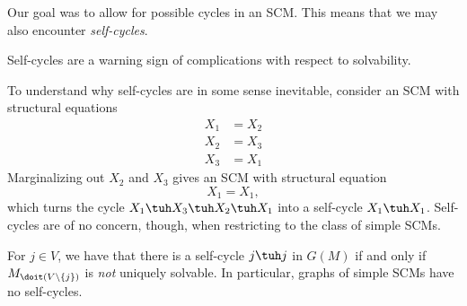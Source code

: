 Our goal was to allow for possible cycles in an SCM. This means that we may also encounter \emph{self-cycles}.
Self-cycles are a warning sign of complications with respect to solvability.

To understand why self-cycles are in some sense inevitable, consider an SCM with structural equations
\begin{align*}
  X_1 &= X_2 \\
  X_2 &= X_3 \\
  X_3 &= X_1 
\end{align*}
Marginalizing out $X_2$ and $X_3$ gives an SCM with structural equation
$$X_1 = X_1,$$
which turns the cycle $X_1\tuh X_3 \tuh X_2\tuh X_1$ into a self-cycle $X_1\tuh X_1$.
Self-cycles are of no concern, though, when restricting to the class of simple SCMs.
\begin{Prp}
  For $j \in V$, we have that there is a self-cycle $j \tuh j$ in $G(M)$ if and only if
  $M_{\doit(V\setminus \{j\})}$ is \emph{not} uniquely solvable. 
  In particular, graphs of simple SCMs have no self-cycles.
\end{Prp}

